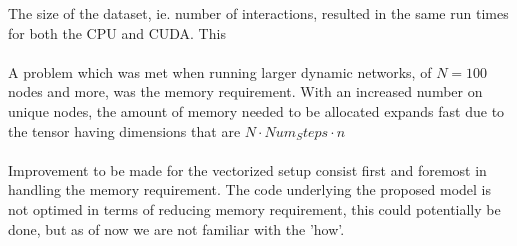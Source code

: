 The size of the dataset, ie. number of interactions, resulted in the same run times for both the CPU and CUDA.
This 
\\\\
A problem which was met when running larger dynamic networks, of $N = 100$ nodes and more, was the memory requirement.
With an increased number on unique nodes, the amount of memory needed to be allocated expands fast due to the tensor having dimensions that are $N \cdot Num_Steps \cdot n$
\\\\
Improvement to be made for the vectorized setup consist first and foremost in handling the memory requirement. 
The code underlying the proposed model is not optimed in terms of reducing memory requirement, this could potentially be done, but as of now we are not familiar with the 'how'.






